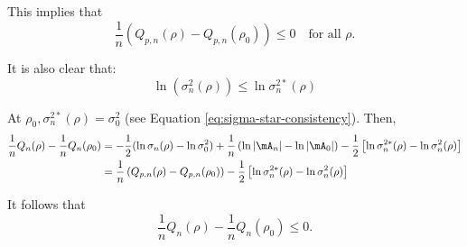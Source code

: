 \documentclass[english,12pt]{book}\usepackage[]{graphicx}\usepackage[]{xcolor}
\begin{document}
\begin{subappendices}
This implies that 
\begin{equation*}
  \frac{1}{n}\left(Q_{p,n}(\rho) - Q_{p, n}(\rho_0)\right)\leq 0 \quad \mbox{for all $\rho$}. 
\end{equation*}

It is also clear that:
\begin{equation}
\ln(\sigma_n^2(\rho)) \leq \ln\sigma_n^{2*}(\rho)
\end{equation}

At $\rho_0, \sigma^{2*}_n(\rho) = \sigma_0^2$ (see Equation \eqref{eq:sigma-star-consistency}). Then, 
\begin{equation*}
\begin{aligned}
\frac{1}{n}Q_n(\rho) - \frac{1}{n}Q_n(\rho_0) & = -\frac{1}{2}(\ln \sigma_n(\rho) - \ln \sigma_0^2) + \frac{1}{n}\left(\ln \left|\mA_n\right| - \ln \left|\mA_0\right|\right)- \frac{1}{2}\left[\ln \sigma_n^{2*}(\rho) - \ln \sigma_n^2(\rho)\right] \\
& = \frac{1}{n}\left(Q_{p,n}(\rho) - Q_{p, n}(\rho_0)\right)- \frac{1}{2}\left[\ln \sigma_n^{2*}(\rho) - \ln \sigma_n^2(\rho)\right] 
\end{aligned}
\end{equation*}

It follows that 
\begin{equation*}
\frac{1}{n}Q_n(\rho) - \frac{1}{n}Q_n(\rho_0) \leq 0.
\end{equation*}









\end{subappendices}
\end{document}

